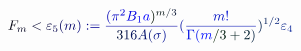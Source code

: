 \documentclass[12pt]{article}
\begin{document}
\makeatletter
\renewcommand*{\@textcolor}[3]{%
  \protect\leavevmode
  \begingroup
    \color#1{#2}#3%
  \endgroup
}
\makeatother
\begin{displaymath}
\mathcolor[RGB]{0,0,15}{F} _ { \mathcolor[RGB]{0,0,30}{m} } \mathcolor[RGB]{0,0,45}{<} \mathcolor[RGB]{0,0,60}{\varepsilon} _ { \mathcolor[RGB]{0,0,75}{5} } \mathcolor[RGB]{0,0,90}{(} \mathcolor[RGB]{0,0,105}{m} \mathcolor[RGB]{0,0,120}{)} \mathcolor[RGB]{0,0,135}{:} \mathcolor[RGB]{0,0,150}{=} \mathcolor[RGB]{0,0,165}{\frac { \mathcolor[RGB]{0,0,180}{(} \mathcolor[RGB]{0,0,195}{\pi} ^ { \mathcolor[RGB]{0,0,210}{2} } \mathcolor[RGB]{0,0,225}{B} _ { \mathcolor[RGB]{0,0,240}{1} } \mathcolor[RGB]{0,0,255}{a} \mathcolor[RGB]{0,15,0}{)} ^ { \mathcolor[RGB]{0,15,15}{m} \mathcolor[RGB]{0,15,30}{/} \mathcolor[RGB]{0,15,45}{3} } } { \mathcolor[RGB]{0,15,60}{3} \mathcolor[RGB]{0,15,75}{1} \mathcolor[RGB]{0,15,90}{6} \mathcolor[RGB]{0,15,105}{A} \mathcolor[RGB]{0,15,120}{(} \mathcolor[RGB]{0,15,135}{\sigma} \mathcolor[RGB]{0,15,150}{)} } } \mathcolor[RGB]{0,15,165}{(} \mathcolor[RGB]{0,15,180}{\frac { \mathcolor[RGB]{0,15,195}{m} \mathcolor[RGB]{0,15,210}{!} } { \mathcolor[RGB]{0,15,225}{\Gamma} \mathcolor[RGB]{0,15,240}{(} \mathcolor[RGB]{0,15,255}{m} \mathcolor[RGB]{0,30,0}{/} \mathcolor[RGB]{0,30,15}{3} \mathcolor[RGB]{0,30,30}{+} \mathcolor[RGB]{0,30,45}{2} \mathcolor[RGB]{0,30,60}{)} } } \mathcolor[RGB]{0,30,75}{)} ^ { \mathcolor[RGB]{0,30,90}{1} \mathcolor[RGB]{0,30,105}{/} \mathcolor[RGB]{0,30,120}{2} } \mathcolor[RGB]{0,30,135}{\varepsilon} _ { \mathcolor[RGB]{0,30,150}{4} }
\end{displaymath}
\end{document}
